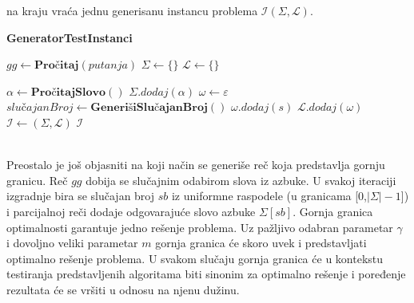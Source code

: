 \documentclass[12pt,oneside]{memoir}
\begin{document}
na kraju vraća jednu generisanu instancu problema $\mathcal{I}(\Sigma,\mathcal{L})$.
\\
\begin{algorithm}
  \caption{\textbf{GeneratorTestInstanci}}
  \label{alg:generatorTestInstanci}
  \begin{algorithmic}[1]
  \State $gg \gets \textbf{Pročitaj}(putanja)$ 
  \State $\Sigma \gets \{\}$
  \State $\mathcal{L} \gets \{\}$
  \State

    \State $\alpha \gets \textbf{PročitajSlovo}()$
    \State $\Sigma .dodaj(\alpha)$
  \EndFor
  \State
    \State $\omega \gets \varepsilon$
      \State $slu\textrm{č}ajanBroj \gets \textbf{GenerišiSlučajanBroj}()$
        \State $\omega .dodaj(s)$
      \EndIf
    \EndFor
    \State
    \State $\mathcal{L} .dodaj(\omega)$
    \State
  \EndFor
  \State
  \State $\mathcal{I} \gets (\Sigma,\mathcal{L})$
  \State
  \State \Return $\mathcal{I}$
  \end{algorithmic}
  \end{algorithm}
\\
Preostalo je još objasniti na koji način se generiše reč koja predstavlja gornju granicu.
Reč $gg$ dobija se slučajnim odabirom slova iz azbuke. U svakoj iteraciji 
izgradnje bira se slučajan broj $sb$ iz uniformne
raspodele (u granicama [0,$|\Sigma|-1$]) i parcijalnoj reči dodaje 
odgovarajuće slovo azbuke $\Sigma[sb]$.
Gornja granica optimalnosti garantuje jedno rešenje problema. Uz pažljivo odabran parametar
$\gamma$ i dovoljno veliki parametar $m$ gornja granica će skoro uvek i predstavljati
optimalno rešenje problema. U svakom slučaju gornja granica će u kontekstu testiranja
predstavljenih algoritama biti sinonim za optimalno rešenje i poređenje rezultata će se
vršiti u odnosu na njenu dužinu.
\end{document}
